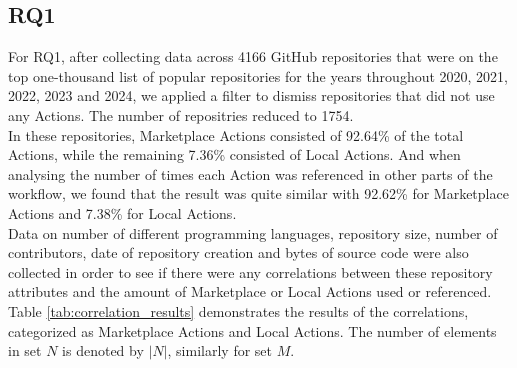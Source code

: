 \documentclass[conference]{IEEEtran}
\begin{document}
  \subsection{RQ1}
      For RQ1, after collecting data across 4166 GitHub repositories that were on the top one-thousand list of popular repositories for the years throughout 2020, 2021, 2022, 2023 and 2024, we applied a filter to dismiss repositories that did not use any Actions. The number of repositries reduced to 1754. \\ 
      In these repositories, Marketplace Actions consisted of 92.64\% of the total Actions, while the remaining 7.36\% consisted of Local Actions. And when analysing the number of times each Action was referenced in other parts of the workflow, we found that the result was quite similar with 92.62\% for Marketplace Actions and 7.38\% for Local Actions. 
      \\
      Data on number of different programming languages, repository size, number of contributors, date of repository creation and bytes of source code were also collected in order to see if there were any correlations between these repository attributes and the amount of Marketplace or Local Actions used or referenced.
      Table \ref{tab:correlation_results} demonstrates the results of the correlations, categorized as Marketplace Actions and Local Actions. The number of elements in set $N$ is denoted by $|N|$, similarly for set $M$. \\
      
\end{document}
